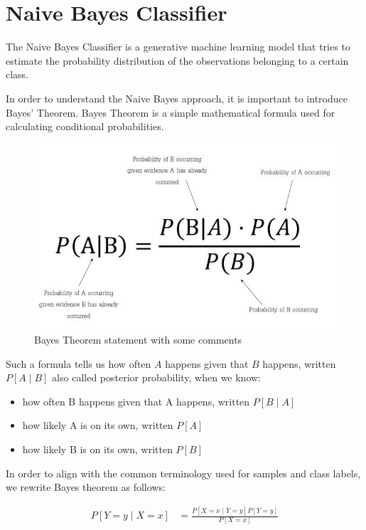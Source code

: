 \break
\section{Naive Bayes Classifier}

The Naive Bayes Classifier is a generative machine learning model that tries to estimate the probability distribution of the observations belonging to a certain class.

In order to understand the Naive Bayes approach, it is important to introduce Bayes’ Theorem. Bayes Theorem is a simple mathematical formula used for calculating conditional probabilities.

\begin{figure}[h]
    \centering
    \includegraphics[scale=0.5]{images/naive-bayes/bayes-formula.jpg}
    \caption{Bayes Theorem statement with some comments}
    \label{fig:bayes_theorem_formula}
\end{figure}

Such a formula tells us how often $A$ happens given that $B$ happens, written $P[A \mid B]$ also called posterior probability, when we know:

\begin{itemize}
    \item how often B happens given that A happens, written $P[B \mid A]$
    \item how likely A is on its own, written $P[A]$
    \item how likely B is on its own, written $P[B]$
\end{itemize}


In order to align with the common terminology used for samples and class labels, we rewrite Bayes theorem as follows:

$$
\begin{aligned}
    P[Y = y \mid X = x] & = \frac{P[X = x \mid Y = y]P[Y = y]}{P[X = x]}
\end{aligned}
$$

